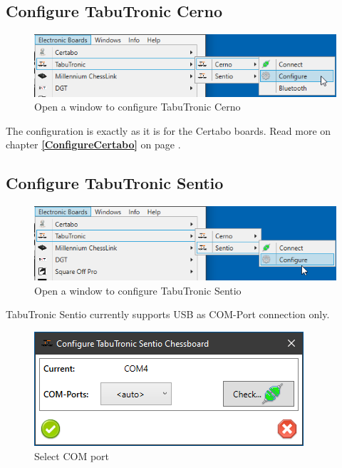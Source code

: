 \documentclass[11pt,a4paper]{article}
\begin{document}
\subsection{Configure TabuTronic Cerno} \label{ConfigureTabuTronicCerno}

\begin{figure}[H]
	\centering
	\includegraphics[scale=0.8]{Cerno1.png}
	\caption{Open a window to configure TabuTronic Cerno}
	\label{fig:Cerno1}
\end{figure}

The configuration is exactly as it is for the Certabo boards.
Read more on chapter \textbf{\ref{ConfigureCertabo}  } on page \pageref{ConfigureCertabo}.

\subsection{Configure TabuTronic Sentio} \label{ConfigureTabuTronicSentio}

\begin{figure}[H]
	\centering
	\includegraphics[scale=0.8]{Sentio1.png}
	\caption{Open a window to configure TabuTronic Sentio }
	\label{fig:Sentio1}
\end{figure}

TabuTronic Sentio currently supports USB as COM-Port connection only.

\begin{figure}[H]
	\centering
	\includegraphics[scale=1.0]{Sentio2.png}
	\caption{Select COM port}
	\label{fig:Sentio2}
\end{figure}
\end{document}
